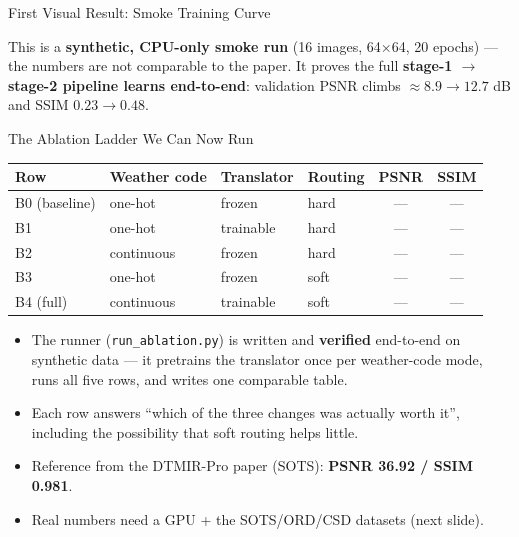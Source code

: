 \documentclass[11pt]{beamer}
\begin{document}
\begin{frame}{First Visual Result: Smoke Training Curve}
\centering
{}
\vspace{2mm}

\small This is a \textbf{synthetic, CPU-only smoke run} (16 images, 64$\times$64, 20
epochs) --- the numbers are not comparable to the paper. It proves the full
\textbf{stage-1 $\rightarrow$ stage-2 pipeline learns end-to-end}: validation PSNR
climbs $\approx 8.9 \to 12.7$ dB and SSIM $0.23 \to 0.48$.
\end{frame}

\begin{frame}{The Ablation Ladder We Can Now Run}
\footnotesize
\begin{tabular}{l l l l c c}
\toprule
\textbf{Row} & \textbf{Weather code} & \textbf{Translator} & \textbf{Routing} & \textbf{PSNR} & \textbf{SSIM} \\
\midrule
B0 (baseline) & one-hot & frozen & hard & --- & --- \\
B1 & one-hot & trainable & hard & --- & --- \\
B2 & continuous & frozen & hard & --- & --- \\
B3 & one-hot & frozen & soft & --- & --- \\
B4 (full) & continuous & trainable & soft & --- & --- \\
\bottomrule
\end{tabular}
\vspace{3mm}

\begin{itemize}
  \item The runner (\texttt{run\_ablation.py}) is written and \textbf{verified} end-to-end
  on synthetic data --- it pretrains the translator once per weather-code mode, runs all
  five rows, and writes one comparable table.
  \item Each row answers ``which of the three changes was actually worth it'', including
  the possibility that soft routing helps little.
  \item Reference from the DTMIR-Pro paper (SOTS): \textbf{PSNR 36.92 / SSIM 0.981}.
  \item Real numbers need a GPU + the SOTS/ORD/CSD datasets (next slide).
\end{itemize}
\end{frame}
\end{document}
